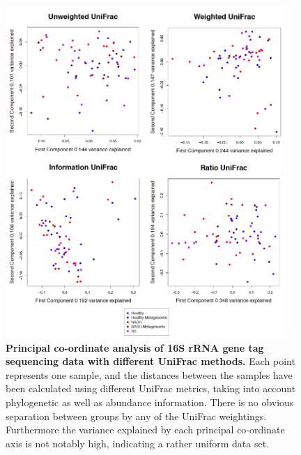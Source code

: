 \begin{figure}[h]
\begin{center}
\includegraphics[width=0.95\textwidth]{nafld_16s_pcoa.png}
\caption[Principal co-ordinate analysis of 16S rRNA gene tag sequencing data with different UniFrac weightings.]{\textbf{Principal co-ordinate analysis of 16S rRNA gene tag sequencing data with different UniFrac methods.} Each point represents one sample, and the distances between the samples have been calculated using different UniFrac metrics, taking into account phylogenetic as well as abundance information. There is no obvious separation between groups by any of the UniFrac weightings. Furthermore the variance explained by each principal co-ordinate axis is not notably high, indicating a rather uniform data set.}
\label{nafld_pcoa}
\end{center}
\end{figure}

